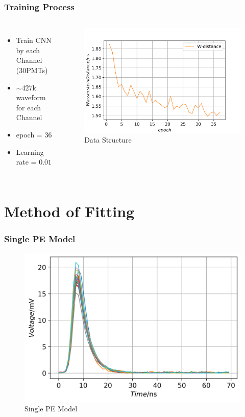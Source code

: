 \documentclass[handout]{beamer}
\begin{document}
\begin{frame}
\frametitle{Training Process}
\begin{columns}
\begin{itemize}
    \item Train CNN by each Channel (30PMTs)
    \item $\sim$427k waveform for each Channel
    \item epoch = 36
    \item Learning rate = $0.01$
\end{itemize}
\begin{figure}
    \centering
    \caption{Data Structure}
    \includegraphics[width=1.0\linewidth]{img/epoch.png}
\end{figure}
\end{columns}
\end{frame}

\section{Method of Fitting}

\begin{frame}
\frametitle{Single PE Model}
\begin{figure}
    \centering
    \caption{Single PE Model}
    \includegraphics[width=0.9\linewidth]{img/spe.png}
\end{figure}
\end{frame}
\end{document}

